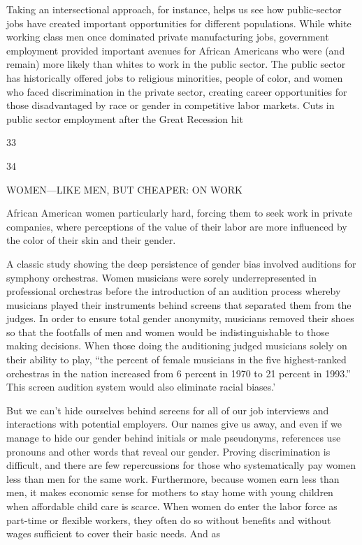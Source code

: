  \par 
Taking an intersectional approach, for instance, helps us see how public-sector jobs have created important opportunities for different populations. While white working class men once dominated private manufacturing jobs, government employment provided important avenues for African Americans who were (and remain) more likely than whites to work in the public sector. The public sector has historically offered jobs to religious minorities, people of color, and women who faced discrimination in the private sector, creating career opportunities for those disadvantaged by race or gender in competitive labor markets. Cuts in public sector employment after the Great Recession hit
 \par 
33
 \par 
34
 \par 
WOMEN—LIKE MEN, BUT CHEAPER: ON WORK
 \par 
African American women particularly hard, forcing them to seek work in private companies, where perceptions of the value of their labor are more influenced by the color of their skin and their gender.
 \par 
A classic study showing the deep persistence of gender bias involved auditions for symphony orchestras. Women musicians were sorely underrepresented in professional orchestras before the introduction of an audition process whereby musicians played their instruments behind screens that separated them from the judges. In order to ensure total gender anonymity, musicians removed their shoes so that the footfalls of men and women would be indistinguishable to those making decisions. When those doing the auditioning judged musicians solely on their ability to play, “the percent of female musicians in the five highest-ranked orchestras in the nation increased from {\color{blue}6} percent in 1970 to {\color{blue}21} percent in 1993.” This screen audition system would also eliminate racial biases.’
 \par 
But we can’t hide ourselves behind screens for all of our job interviews and interactions with potential employers. Our names give us away, and even if we manage to hide our gender behind initials or male pseudonyms, references use pronouns and other words that reveal our gender. Proving discrimination is difficult, and there are few repercussions for those who systematically pay women less than men for the same work. Furthermore, because women earn less than men, it makes economic sense for mothers to stay home with young children when affordable child care is scarce. When women do enter the labor force as part-time or flexible workers, they often do so without benefits and without wages sufficient to cover their basic needs. And as
